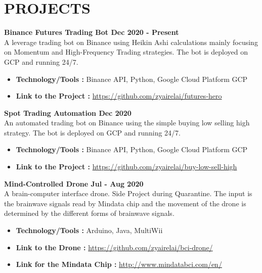\section{PROJECTS}

\textbf{Binance Futures Trading Bot \hfill Dec 2020 - Present} \vspace{0.1cm} \\
    A leverage trading bot on Binance using Heikin Ashi calculations mainly focusing on Momentum and High-Frequency Trading strategies. The bot is deployed on GCP and running 24/7. \vspace{0.2cm}
    \begin{itemize}
        \item \textbf{Technology/Tools :} Binance API, Python, Google Cloud Platform GCP
        \item \textbf{Link to the Project :} \url{https://github.com/zyairelai/futures-hero}
    \end{itemize}

\textbf{Spot Trading Automation \hfill Dec 2020} \vspace{0.1cm} \\
    An automated trading bot on Binance using the simple buying low selling high strategy. The bot is deployed on GCP and running 24/7. \vspace{0.2cm}
    \begin{itemize}
        \item \textbf{Technology/Tools :} Binance API, Python, Google Cloud Platform GCP
        \item \textbf{Link to the Project :} \url{https://github.com/zyairelai/buy-low-sell-high}
    \end{itemize}

\textbf{Mind-Controlled Drone \hfill Jul - Aug 2020} \vspace{0.1cm} \\
    A brain-computer interface drone. Side Project during Quarantine. The input is the brainwave signals read by Mindata chip and the movement of the drone is determined by the different forms of brainwave signals. \vspace{0.2cm}
    \begin{itemize}
        \item \textbf{Technology/Tools :} Arduino, Java, MultiWii
        \item \textbf{Link to the Drone :} \url{https://github.com/zyairelai/bci-drone/}
        \item \textbf{Link for the Mindata Chip :} \url{http://www.mindatabci.com/en/}
    \end{itemize}

